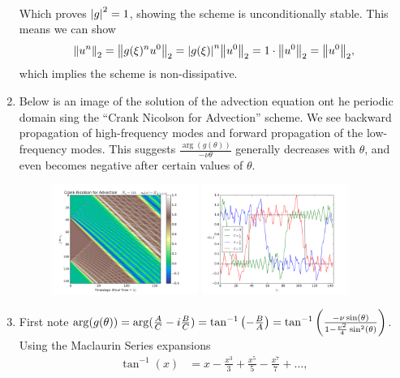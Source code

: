 \documentclass{article} %
\theoremstyle{plain}
\numberwithin{equation}{section} %
\numberwithin{figure}{section} %
\numberwithin{table}{section} %
\begin{document}
\begin{enumerate}[\ \ (a)]
\begin{align*}
        \end{align*}
        Which proves $\abs{g}^2 = 1$, showing the scheme is unconditionally stable.  This means we can show
        \begin{align*}
            \norm{u^n}_2 = \norm{g(\xi)^nu^0}_2 = \abs{g(\xi)}^n\norm{u^0}_2 = 1\cdot\norm{u^0}_2 = \norm{u^0}_2,
        \end{align*}
        which implies the scheme is non-dissipative.
    \item
        Below is an image of the solution of the advection equation ont he periodic domain sing the ``Crank Nicolson for Advection'' scheme.  We see backward propagation of high-frequency modes and forward propagation of the low-frequency modes.  This suggests $\frac{\arg(g(\theta))}{-\nu\theta}$ generally decreases with $\theta$, and even becomes negative after certain values of $\theta$.
        \begin{figure}[ht!]
            \centering
            \includegraphics[width=0.45\textwidth]{figures/CN_discon.png}
            \includegraphics[width=0.45\textwidth]{figures/CN_snapshots.png}
        \end{figure}
        \FloatBarrier
    \item
        First note $\arg(g(\theta)) = \arg(\frac{A}{C} - i\frac{B}{C}) = \tan^{-1}\qty(-\frac{B}{A}) = \tan^{-1}\qty(\frac{-\nu\sin(\theta)}{1 - \frac{\nu^2}{4}\sin^2(\theta)})$.  Using the Maclaurin Series expansions
        \begin{align*}
            \tan^{-1}(x) &= x - \frac{x^3}{3} + \frac{x^5}{5} - \frac{x^7}{7} + \dots, \\

\end{align*}
\end{enumerate}
\end{document}

